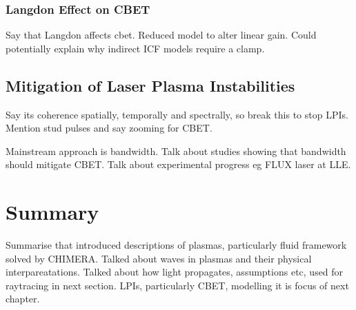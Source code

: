 \subsubsection{Langdon Effect on CBET}%
\label{sec:theory_cbet_langdon}

Say that Langdon affects cbet.
Reduced model to alter linear gain.
Could potentially explain why indirect ICF models require a clamp.

\subsection{Mitigation of Laser Plasma Instabilities}%
\label{sec:theory_lpi_mitigation}

Say its coherence spatially, temporally and spectrally, so break this to stop LPIs.
Mention stud pulses and say zooming for CBET.

Mainstream approach is bandwidth.
Talk about studies showing that bandwidth should mitigate CBET.
Talk about experimental progress eg FLUX laser at LLE.


\section{Summary}%
\label{sec:theory_summary}

Summarise that introduced descriptions of plasmas, particularly fluid framework solved by CHIMERA.
Talked about waves in plasmas and their physical interpareatations.
Talked about how light propagates, assumptions etc, used for raytracing in next section.
LPIs, particularly CBET, modelling it is focus of next chapter.
